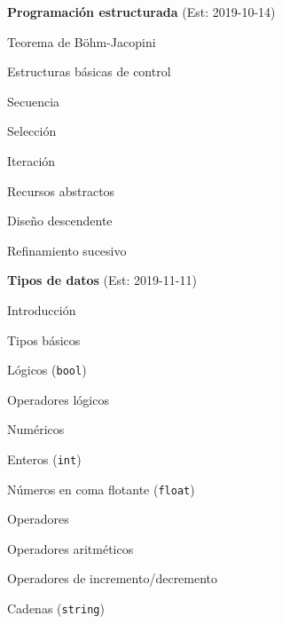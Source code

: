 \begin{longenum}
\begin{longenum}
    \end{longenum}
    \item \textbf{Programación estructurada}  (Est: 2019-10-14)
    \begin{longenum}
        \item Teorema de Böhm-Jacopini
        \item Estructuras básicas de control
        \begin{longenum}
            \item Secuencia
            \item Selección
            \item Iteración
        \end{longenum}
        \item Recursos abstractos
        \item Diseño descendente
        \item Refinamiento sucesivo
    \end{longenum}
    \item \textbf{Tipos de datos}  (Est: 2019-11-11)
    \begin{longenum}
        \item Introducción
        \item Tipos básicos
        \begin{longenum}
            \item Lógicos (\texttt{bool})
            \begin{longenum}
                \item Operadores lógicos
            \end{longenum}
            \item Numéricos
            \begin{longenum}
                \item Enteros (\texttt{int})
                \item Números en coma flotante (\texttt{float})
                \item Operadores
                \begin{longenum}
                    \item Operadores aritméticos
                    \item Operadores de incremento/decremento
                \end{longenum}
            \end{longenum}
            \item Cadenas (\texttt{string})
            \begin{longenum}

\end{longenum}
\end{longenum}
\end{longenum}
\end{longenum}
